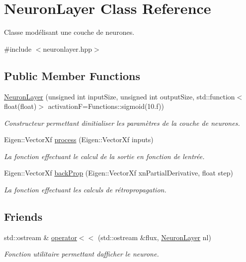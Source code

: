 \hypertarget{classNeuronLayer}{}\section{Neuron\+Layer Class Reference}
\label{classNeuronLayer}


Classe modélisant une couche de neurones.  




{\ttfamily \#include $<$neuronlayer.\+hpp$>$}

\subsection*{Public Member Functions}
\begin{DoxyCompactItemize}
\item 
\hyperlink{classNeuronLayer_afe2804871685b8103d7cd461460e7b31}{Neuron\+Layer} (unsigned int input\+Size, unsigned int output\+Size, std\+::function$<$ float(float)$>$ activationF=Functions\+::sigmoid(10.f))
\begin{DoxyCompactList}\small\item\em Constructeur permettant d\textquotesingle{}initialiser les paramètres de la couche de neurones. \end{DoxyCompactList}\item 
Eigen\+::\+Vector\+Xf \hyperlink{classNeuronLayer_aa374ba7d040ae618b5037aa88e5efae7}{process} (Eigen\+::\+Vector\+Xf inputs)
\begin{DoxyCompactList}\small\item\em La fonction effectuant le calcul de la sortie en fonction de l\textquotesingle{}entrée. \end{DoxyCompactList}\item 
Eigen\+::\+Vector\+Xf \hyperlink{classNeuronLayer_a0896580aa265681f77efbcb81c6c8150}{back\+Prop} (Eigen\+::\+Vector\+Xf xn\+Partial\+Derivative, float step)
\begin{DoxyCompactList}\small\item\em La fonction effectuant les calculs de rétropropagation. \end{DoxyCompactList}\end{DoxyCompactItemize}
\subsection*{Friends}
\begin{DoxyCompactItemize}
\item 
std\+::ostream \& \hyperlink{classNeuronLayer_adbe40702c22550c0392b3447e5d63c9a}{operator$<$$<$} (std\+::ostream \&flux, \hyperlink{classNeuronLayer}{Neuron\+Layer} nl)
\begin{DoxyCompactList}\small\item\em Fonction utilitaire permettant d\textquotesingle{}afficher le neurone. \end{DoxyCompactList}\end{DoxyCompactItemize}


